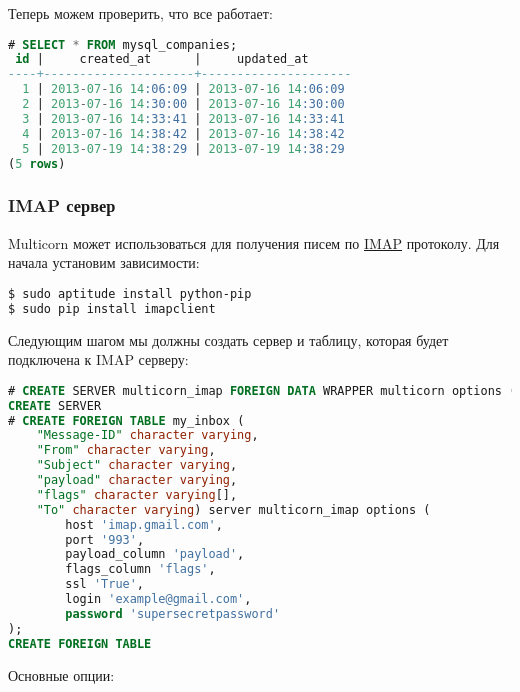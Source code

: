 Теперь можем проверить, что все работает:

\begin{lstlisting}[language=SQL,label=lst:pgmulticorn-rdbms5,caption=Multicorn]
# SELECT * FROM mysql_companies;
 id |     created_at      |     updated_at
----+---------------------+---------------------
  1 | 2013-07-16 14:06:09 | 2013-07-16 14:06:09
  2 | 2013-07-16 14:30:00 | 2013-07-16 14:30:00
  3 | 2013-07-16 14:33:41 | 2013-07-16 14:33:41
  4 | 2013-07-16 14:38:42 | 2013-07-16 14:38:42
  5 | 2013-07-19 14:38:29 | 2013-07-19 14:38:29
(5 rows)
\end{lstlisting}


\subsubsection{IMAP сервер}

Multicorn может использоваться для получения писем по \href{https://ru.wikipedia.org/wiki/IMAP}{IMAP} протоколу. Для начала установим зависимости:

\begin{lstlisting}[language=Bash,label=lst:pgmulticorn-imap1,caption=Multicorn]
$ sudo aptitude install python-pip
$ sudo pip install imapclient
\end{lstlisting}

Следующим шагом мы должны создать сервер и таблицу, которая будет подключена к IMAP серверу:

\begin{lstlisting}[language=SQL,label=lst:pgmulticorn-imap2,caption=Multicorn]
# CREATE SERVER multicorn_imap FOREIGN DATA WRAPPER multicorn options ( wrapper 'multicorn.imapfdw.ImapFdw' );
CREATE SERVER
# CREATE FOREIGN TABLE my_inbox (
    "Message-ID" character varying,
    "From" character varying,
    "Subject" character varying,
    "payload" character varying,
    "flags" character varying[],
    "To" character varying) server multicorn_imap options (
        host 'imap.gmail.com',
        port '993',
        payload_column 'payload',
        flags_column 'flags',
        ssl 'True',
        login 'example@gmail.com',
        password 'supersecretpassword'
);
CREATE FOREIGN TABLE
\end{lstlisting}

Основные опции:

